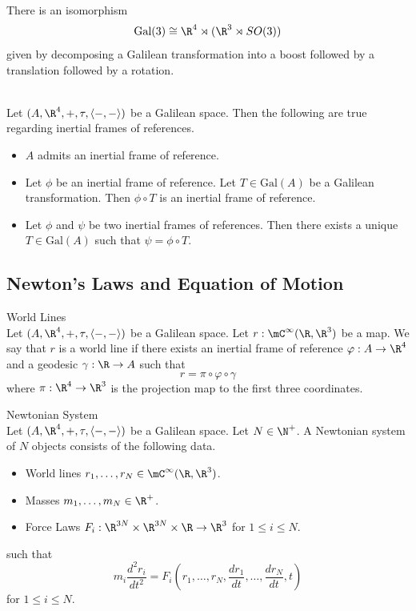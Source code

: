 \documentclass[a4paper]{article}
\begin{document}
\begin{prp}{}{}\\
There is an isomorphism $$\text{Gal}(3)\cong\R^4\rtimes(\R^3\rtimes SO(3))$$ given by decomposing a Galilean transformation into a boost followed by a translation followed by a rotation. 
\end{prp}

\begin{prp}{}{}\\
Let $(A,\R^4,+,\tau,\langle-,-\rangle)$ be a Galilean space. Then the following are true regarding inertial frames of references. 
\begin{itemize}
\item $A$ admits an inertial frame of reference. 
\item Let $\phi$ be an inertial frame of reference. Let $T\in\text{Gal}(A)$ be a Galilean transformation. Then $\phi\circ T$ is an inertial frame of reference. 
\item Let $\phi$ and $\psi$ be two inertial frames of references. Then there exists a unique $T\in\text{Gal}(A)$ such that $\psi=\phi\circ T$. 
\end{itemize}
\end{prp}

\subsection{Newton's Laws and Equation of Motion}
\begin{defn}{World Lines}{}\\
Let $(A,\R^4,+,\tau,\langle-,-\rangle)$ be a Galilean space. Let $r:\mC^\infty(\R,\R^3)$ be a map. We say that $r$ is a world line if there exists an inertial frame of reference $\varphi:A\to\R^4$ and a geodesic $\gamma:\R\to A$ such that $$r=\pi\circ\varphi\circ\gamma$$ where $\pi:\R^4\to\R^3$ is the projection map to the first three coordinates. 
\end{defn}

\begin{defn}{Newtonian System}{}\\
Let $(A,\R^4,+,\tau,\langle-,-\rangle)$ be a Galilean space. Let $N\in\N^+$. A Newtonian system of $N$ objects consists of the following data. 
\begin{itemize}
\item World lines $r_1,\dots,r_N\in\mC^\infty(\R,\R^3)$. 
\item Masses $m_1,\dots,m_N\in\R^+$. 
\item Force Laws $F_i:\R^{3N}\times\R^{3N}\times\R\to\R^3$ for $1\leq i\leq N$. 
\end{itemize}
such that $$m_i\frac{d^2r_i}{dt^2}=F_i\left(r_1,\dots,r_N,\frac{dr_1}{dt},\dots,\frac{dr_N}{dt},t\right)$$ for $1\leq i\leq N$. 
\end{defn}
\end{document}
